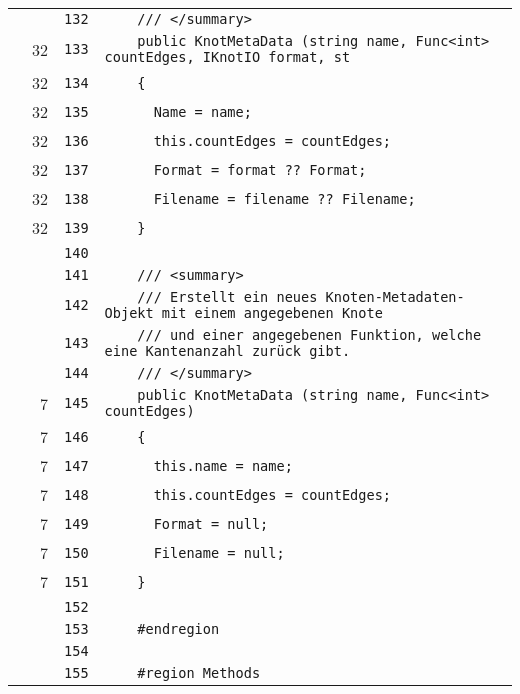 \documentclass[a4paper,10pt]{article}
\begin{document}
\begin{longtable}[l]{lrrl}
\cellcolor{gray} &  & \verb~132~ & \verb~    /// </summary>~\\
\cellcolor{green} & 32 & \verb~133~ & \verb~    public KnotMetaData (string name, Func<int> countEdges, IKnotIO format, st~\\
\cellcolor{green} & 32 & \verb~134~ & \verb~    {~\\
\cellcolor{green} & 32 & \verb~135~ & \verb~      Name = name;~\\
\cellcolor{green} & 32 & \verb~136~ & \verb~      this.countEdges = countEdges;~\\
\cellcolor{green} & 32 & \verb~137~ & \verb~      Format = format ?? Format;~\\
\cellcolor{green} & 32 & \verb~138~ & \verb~      Filename = filename ?? Filename;~\\
\cellcolor{green} & 32 & \verb~139~ & \verb~    }~\\
\cellcolor{gray} &  & \verb~140~ & \verb~~\\
\cellcolor{gray} &  & \verb~141~ & \verb~    /// <summary>~\\
\cellcolor{gray} &  & \verb~142~ & \verb~    /// Erstellt ein neues Knoten-Metadaten-Objekt mit einem angegebenen Knote~\\
\cellcolor{gray} &  & \verb~143~ & \verb~    /// und einer angegebenen Funktion, welche eine Kantenanzahl zurück gibt.~\\
\cellcolor{gray} &  & \verb~144~ & \verb~    /// </summary>~\\
\cellcolor{green} & 7 & \verb~145~ & \verb~    public KnotMetaData (string name, Func<int> countEdges)~\\
\cellcolor{green} & 7 & \verb~146~ & \verb~    {~\\
\cellcolor{green} & 7 & \verb~147~ & \verb~      this.name = name;~\\
\cellcolor{green} & 7 & \verb~148~ & \verb~      this.countEdges = countEdges;~\\
\cellcolor{green} & 7 & \verb~149~ & \verb~      Format = null;~\\
\cellcolor{green} & 7 & \verb~150~ & \verb~      Filename = null;~\\
\cellcolor{green} & 7 & \verb~151~ & \verb~    }~\\
\cellcolor{gray} &  & \verb~152~ & \verb~~\\
\cellcolor{gray} &  & \verb~153~ & \verb~    #endregion~\\
\cellcolor{gray} &  & \verb~154~ & \verb~~\\
\cellcolor{gray} &  & \verb~155~ & \verb~    #region Methods~\\

\end{longtable}
\end{document}
